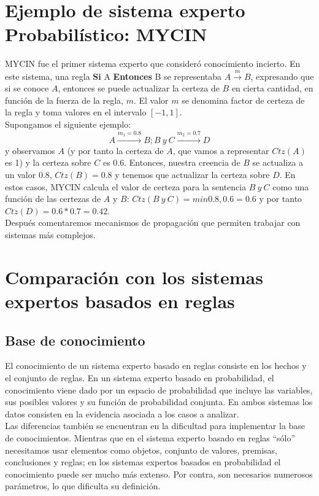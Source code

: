 \documentclass{article}
\theoremstyle{definition_wo_parentheses}
\begin{document}
\section{Ejemplo de sistema experto Probabilístico: MYCIN}
MYCIN fue el primer sistema experto que consideró conocimiento incierto. En este sistema, una regla \textbf{Si} A \textbf{Entonces} B se representaba $A \overset{m}{\rightarrow}B$, expresando que si se conoce $A$, entonces se puede actualizar la certeza de $B$ en cierta cantidad, en función de la fuerza de la regla, $m$. El valor $m$ se denomina factor de certeza de la regla y toma valores en el intervalo $[-1,1]$.\\

Supongamos el siguiente ejemplo:
\[A \overset{m_1=0.8}{\longrightarrow} B ; B\ y\ C \overset{m_2=0.7}{\longrightarrow} D
\]
y observamos $A$ (y por tanto la certeza de $A$, que vamos a representar $Ctz(A)$ es 1) y la certeza sobre $C$ es 0.6. Entonces, nuestra creencia de $B$ se actualiza a un valor 0.8, $Ctz(B)=0.8$ y tenemos que actualizar la certeza sobre $D$. En estos casos, MYCIN calcula el valor de certeza para la sentencia $B\ y \ C$ como una función de las certezas de $A$ y $B$: $Ctz(B\ y\ C) = min{0.8,0.6}=0.6$ y por tanto $Ctz(D)=0.6*0.7=0.42$.\\

Después comentaremos mecanismos de propagación que permiten trabajar con sistemas más complejos.

\section{Comparación con los sistemas expertos basados en reglas}

\subsection{Base de conocimiento}

El conocimiento de un sistema experto basado en reglas consiste en los hechos y el conjunto de reglas. En un sistema experto basado en probabilidad, el conocimiento viene dado por un espacio de probabilidad que incluye las variables, sus posibles valores y su función de probabilidad conjunta. En ambos sistemas los datos consisten en la evidencia asociada a los casos a analizar.\\
Las diferencias también se encuentran en la dificultad para implementar la base de conocimientos. Mientras que en el sistema experto basado en reglas ``sólo'' necesitamos usar elementos como objetos, conjunto de valores, premisas, conclusiones y reglas; en los sistemas expertos basados en probabilidad el conocimiento puede ser mucho más extenso. Por contra, son necesarios numerosos parámetros, lo que dificulta su definición.
\end{document}
